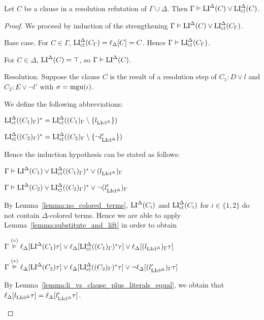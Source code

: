 \documentclass[,%
	draft=false,%
	numbers=noendperiod
	11pt,
	a4paper,
	oneside,%
	openany,
]{memoir}
\begin{document}
\begin{lemma}
	\label{lemma:gamma_entails_lide}
	Let $C$ be a clause in a resolution refutation of $\Gamma\cup\Delta$. Then
	$\Gamma\vDash \operatorname{LI}^\Delta(C) \lor \operatorname{LI}_{\operatorname{cl}}^\Delta(C)$.
\end{lemma}
\begin{proof}
	We proceed by induction of the strengthening $\Gamma\vDash \operatorname{LI}^\Delta(C) \lor \operatorname{LI}_{\operatorname{cl}}^\Delta(C_\Gamma)$.

	\begin{description}
		\item{} Base case.
			For $C\in\Gamma$, $\operatorname{LI}_{\operatorname{cl}}^\Delta(C_\Gamma) = \ell_{\Delta}[C] = C$. Hence $\Gamma \vDash \operatorname{LI}_{\operatorname{cl}}^\Delta(C_\Gamma)$.

			For $C\in\Delta$, $\operatorname{LI}^\Delta(C) = \top$, so $\Gamma \vDash \operatorname{LI}^\Delta(C)$.

		\item{} Resolution.
			Suppose the clause $C$ is the result of a resolution step \inference{} of $C_1: D \lor l$ and $C_2: E \lor \lnot l'$ with $\sigma = \operatorname{mgu}(\iota)$.

			\newcommand{\clauseOnePrime}{\LIclde( (C_1)_\Gamma )^*}
			\newcommand{\clauseTwoPrime}{\LIclde( (C_2)_\Gamma )^*}

			We define the following abbreviations:

			$\clauseOnePrime = \LIclde( (C_1)_\Gamma \setminus \{l\cllde\} )$

			$\clauseTwoPrime = \LIclde( (C_2)_\Gamma \setminus \{\lnot l'\cllde\} )$

			Hence the induction hypothesis can be stated as follows:

			$\Gamma \entails \LIde(C_1) \lor \clauseOnePrime \lor (l\cllde)_\Gamma$

			$\Gamma \entails \LIde(C_2) \lor \clauseTwoPrime \lor \lnot (l'\cllde)_\Gamma$

			By Lemma~\ref{lemma:no_colored_terms}, $\operatorname{LI}^\Delta(C_i)$ and $\operatorname{LI}_{\operatorname{cl}}^\Delta(C_i)$ for $i\in\{1,2\}$ do not contain $\Delta$-colored terms. 
			Hence we are able to apply Lemma~\ref{lemma:substitute_and_lift} in order to obtain

			$\Gamma \stackrel\markA\entails \lifdeltanovar{\LIde(C_1)\tau} \lor \lifdeltanovar{\clauseOnePrime\tau} \lor \lifdeltanovar{(l\cllde)_\Gamma\tau}$

			$\Gamma \stackrel\markB\entails \lifdeltanovar{\LIde(C_2)\tau} \lor \lifdeltanovar{\clauseTwoPrime\tau} \lor \lnot \lifdeltanovar{(l'\cllde)_\Gamma\tau}$

			By Lemma~\ref{lemma:li_vs_clause_plus_literals_equal}, we obtain that
			$\ell_{\Delta}[l_{\operatorname{LIcl}^\Delta}\tau] = 
			\ell_{\Delta}[l'_{\operatorname{LIcl}^\Delta}\tau]$.


\end{description}
\end{proof}
\end{document}
